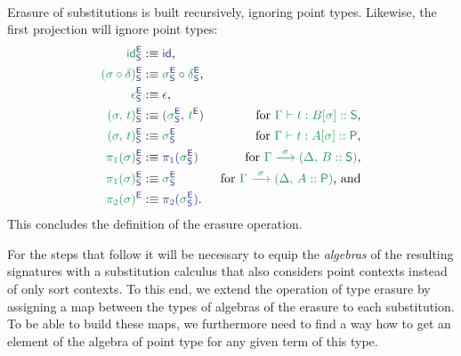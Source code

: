 \begin{defn}
\begin{align*}
\end{align*}
Erasure of substitutions is built recursively, ignoring point types.
Likewise, the first projection will ignore point types:
\begin{align*}\label{eq:red-e-sub}
\tqm{\grm{\id}^\EE_\Sc}
  &:\equiv \tqm{\id} \text{,}
  & \\
\tqm{\grm{(\sigma \circ \delta)}^\EE_\Sc}
  &:\equiv \tqm{\grm{\sigma}^\EE_\Sc \circ \grm{\delta}^\EE_\Sc} \text{,}
  & \\
\tqm{\grm{\epsilon}^\EE_\Sc}
  &:\equiv \tqm{\epsilon} \text{,}
  & \\
\tqm{\grm{(\sigma,\, t)}^\EE_\Sc}
  &:\equiv \tqm{(\grm{\sigma}^\EE_\Sc,\, \grm{t}^\EE)}
  & \text{ for \grm{\Gamma \vdash t : B[\sigma] :: \Sc},} \\
\tqm{\grm{(\sigma,\, t)}^\EE_\Sc}
  &:\equiv \tqm{\grm{\sigma}^\EE_\Sc}
  & \text{ for \grm{\Gamma \vdash t : A[\sigma] :: \Pc},} \\
\tqm{\grm{\pi_1(\sigma)}^\EE_\Sc}
  &:\equiv \tqm{\pi_1(\grm{\sigma}^\EE_\Sc)}
  & \text{ for \grm{\IISub{\sigma}{\Gamma}{(\Delta,\, B :: \Sc)}},} \\
\tqm{\grm{\pi_1(\sigma)}^\EE_\Sc}
  &:\equiv \tqm{\grm{\sigma}^\EE_\Sc}
  & \text{ for \grm{\IISub{\sigma}{\Gamma}{(\Delta,\, A :: \Pc)}}, and} \\
\tqm{\grm{\pi_2(\sigma)}^\EE}
  &:\equiv \tqm{\pi_2(\grm{\sigma}^\EE_\Sc)} \text{.}
  &
\end{align*} %
This concludes the definition of the erasure operation.
\end{defn} %

For the steps that follow it will be necessary to equip the \emph{algebras}
of the resulting signatures with a substitution calculus that also considers
point contexts instead of only sort contexts.
To this end, we extend the operation of type erasure by assigning a map between
the types of algebras of the erasure to each substitution.
To be able to build these maps, we furthermore need to find a way how to get an
element of the algebra of point type for any given term of this type.

